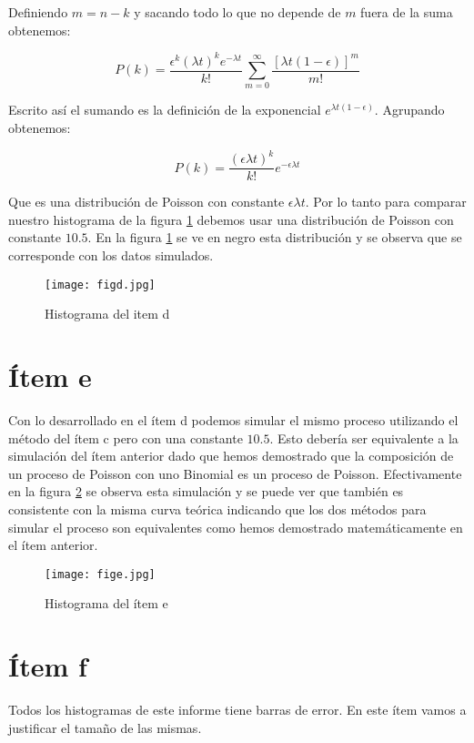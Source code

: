 \documentclass{article}
\begin{document}
Definiendo $m=n-k$ y sacando todo lo que no depende de $m$ fuera de la suma obtenemos:

$$
P(k) = \frac{\epsilon^k (\lambda t)^k e^{-\lambda t}}{k!} \sum_{m=0}^{\infty} \frac{[\lambda t(1- \epsilon)]^m}{m!}
$$

Escrito así el sumando es la definición de la exponencial $e^{\lambda t(1- \epsilon)}$.
Agrupando obtenemos:

$$
P(k) = \frac{(\epsilon \lambda t)^k}{k!} e^{-\epsilon \lambda t}
$$

Que es una distribución de Poisson con constante $\epsilon \lambda t$.
Por lo tanto para comparar nuestro histograma de la figura \ref{fig:itemd} debemos usar una distribución de Poisson con constante $10.5$.
En la figura \ref{fig:itemd} se ve en negro esta distribución y se observa que se corresponde con los datos simulados.


\begin{figure}
\centering
\texttt{[image: figd.jpg]}
\caption[]{Histograma del item d}
\label{fig:itemd}
\end{figure}

\section{Ítem e}

Con lo desarrollado en el ítem d podemos simular el mismo proceso utilizando el método del ítem c pero con una constante $10.5$.
Esto debería ser equivalente a la simulación del ítem anterior dado que hemos demostrado que la composición de un proceso de Poisson con uno Binomial es un proceso de Poisson.
Efectivamente en la figura \ref{fig:iteme} se observa esta simulación y se puede ver que también es consistente con la misma curva teórica indicando que los dos métodos para simular el proceso son equivalentes como hemos demostrado matemáticamente en el ítem anterior.

\begin{figure}
\centering
\texttt{[image: fige.jpg]}
\caption[]{Histograma del ítem e}
\label{fig:iteme}
\end{figure}

\section{Ítem f}
Todos los histogramas de este informe tiene barras de error.
En este ítem vamos a justificar el tamaño de las mismas.
\end{document}
